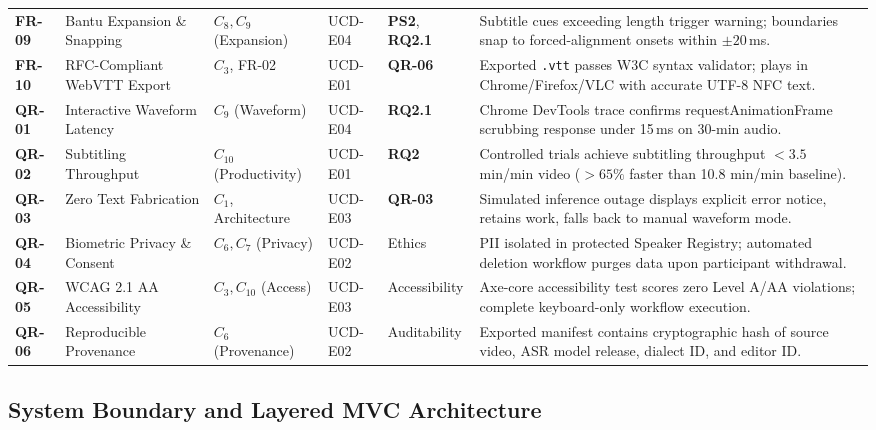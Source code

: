 \documentclass[a4paper,11pt]{article}
\begin{document}
\begin{table}[t]
\begin{tabular}{p{1.2cm} p{3.2cm} p{1.6cm} p{1.5cm} p{1.8cm} >{\raggedright\arraybackslash}p{7.2cm}}
\addlinespace
\textbf{FR-09} & Bantu Expansion \& Snapping & $C_8, C_9$ (Expansion) & UCD-E04 & \textbf{PS2}, \textbf{RQ2.1} & Subtitle cues exceeding length trigger warning; boundaries snap to forced-alignment onsets within $\pm 20$\,ms. \\
\addlinespace
\textbf{FR-10} & RFC-Compliant WebVTT Export & $C_3$, FR-02 & UCD-E01 & \textbf{QR-06} & Exported \texttt{.vtt} passes W3C syntax validator; plays in Chrome/Firefox/VLC with accurate UTF-8 NFC text. \\
\midrule
\textbf{QR-01} & Interactive Waveform Latency & $C_9$ (Waveform) & UCD-E04 & \textbf{RQ2.1} & Chrome DevTools trace confirms requestAnimationFrame scrubbing response under 15\,ms on 30-min audio. \\
\addlinespace
\textbf{QR-02} & Subtitling Throughput & $C_{10}$ (Productivity) & UCD-E01 & \textbf{RQ2} & Controlled trials achieve subtitling throughput $<3.5$ min/min video ($>65\%$ faster than 10.8 min/min baseline). \\
\addlinespace
\textbf{QR-03} & Zero Text Fabrication & $C_1$, Architecture & UCD-E03 & \textbf{QR-03} & Simulated inference outage displays explicit error notice, retains work, falls back to manual waveform mode. \\
\addlinespace
\textbf{QR-04} & Biometric Privacy \& Consent & $C_6, C_7$ (Privacy) & UCD-E02 & Ethics & PII isolated in protected Speaker Registry; automated deletion workflow purges data upon participant withdrawal. \\
\addlinespace
\textbf{QR-05} & WCAG 2.1 AA Accessibility & $C_3, C_{10}$ (Access) & UCD-E03 & Accessibility & Axe-core accessibility test scores zero Level A/AA violations; complete keyboard-only workflow execution. \\
\addlinespace
\textbf{QR-06} & Reproducible Provenance & $C_6$ (Provenance) & UCD-E02 & Auditability & Exported manifest contains cryptographic hash of source video, ASR model release, dialect ID, and editor ID. \\
\bottomrule
\end{tabular}
\end{table}

\subsection{System Boundary and Layered MVC Architecture}
\label{sec:chap3_architecture}
\end{document}
